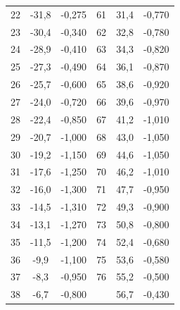 \begin{table}
\begin{tabular}{c c c c c c}
       22 & -31,8 & -0,275 & 61 & 31,4 & -0,770 \\
       23 & -30,4 & -0,340 & 62 & 32,8 & -0,780 \\
       24 & -28,9 & -0,410 & 63 & 34,3 & -0,820 \\
       25 & -27,3 & -0,490 & 64 & 36,1 & -0,870 \\
       26 & -25,7 & -0,600 & 65 & 38,6 & -0,920 \\
       27 & -24,0 & -0,720 & 66 & 39,6 & -0,970 \\
       28 & -22,4 & -0,850 & 67 & 41,2 & -1,010 \\
       29 & -20,7 & -1,000 & 68 & 43,0 & -1,050 \\
       30 & -19,2 & -1,150 & 69 & 44,6 & -1,050 \\
       31 & -17,6 & -1,250 & 70 & 46,2 & -1,010 \\
       32 & -16,0 & -1,300 & 71 & 47,7 & -0,950 \\
       33 & -14,5 & -1,310 & 72 & 49,3 & -0,900 \\
       34 & -13,1 & -1,270 & 73 & 50,8 & -0,800 \\
       35 & -11,5 & -1,200 & 74 & 52,4 & -0,680 \\
       36 &  -9,9 & -1,100 & 75 & 53,6 & -0,580 \\
       37 &  -8,3 & -0,950 & 76 & 55,2 & -0,500 \\
       38 &  -6,7 & -0,800 &    & 56,7 & -0,430 \\ 
    \bottomrule
    \end{tabular}
    \end{table}
